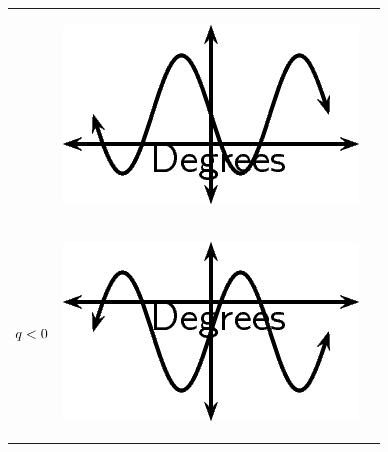 \begin{center}
\begin{xtabular*}{\mytablewidth}[t]{|p{10\mystarwidth}|p{10\mystarwidth}|p{10\mystarwidth}|}
                 &
    \setcounter{subfigure}{0}
\label{m39414*id85384}
    \begin{center}
    \label{m39414*id85384!!!underscore!!!media}\label{m39414*id85384!!!underscore!!!printimage}\includegraphics{col11306.imgs/m39414_MG10C15_020.png} %
      \vspace{2pt}
    \vspace{.1in}
    \end{center}    
     \tabularnewline{}
                  $q<{}0$
                 &
    \setcounter{subfigure}{0}
\label{m39414*id85421}
    \begin{center}
    \label{m39414*id85421!!!underscore!!!media}\label{m39414*id85421!!!underscore!!!printimage}\includegraphics{col11306.imgs/m39414_MG10C15_021.png} %
      \vspace{2pt}
    \vspace{.1in}

\end{center}
\end{xtabular*}
\end{center}
